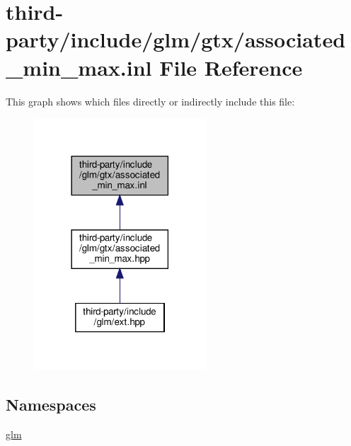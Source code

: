 \hypertarget{associated__min__max_8inl}{}\section{third-\/party/include/glm/gtx/associated\+\_\+min\+\_\+max.inl File Reference}
\label{associated__min__max_8inl}
This graph shows which files directly or indirectly include this file\+:
\nopagebreak
\begin{figure}[H]
\begin{center}
\leavevmode
\includegraphics[width=182pt]{associated__min__max_8inl__dep__incl}
\end{center}
\end{figure}
\subsection*{Namespaces}
\begin{DoxyCompactItemize}
\item 
 \hyperlink{namespaceglm}{glm}
\end{DoxyCompactItemize}

